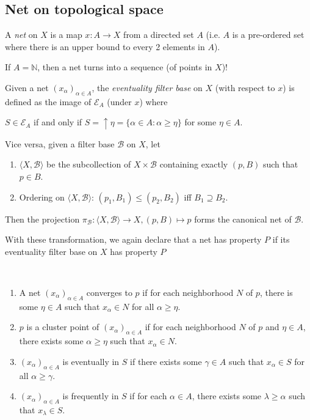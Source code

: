 \documentclass{treatise}
\begin{document}
\subsection{Net on topological space}
A \emph{net} on $X$ is a map $x: A \to X$ from a directed set $A$ (i.e. $A$ is a pre-ordered set where there is an upper bound to every 2 elements in $A$).
\begin{remark}
If $A = \mathbb{N}$, then a net turns into a sequence (of points in $X$)!
\end{remark}
\begin{remark}
Given a net $(x_\alpha)_{\alpha \in A}$, the \emph{eventuality filter base} on $X$ (with respect to $x$) is defined as the image of $\mathcal{E}_A$ (under $x$) where
\begin{center}
    $S \in \mathcal{E}_A$ if and only if $S = \uparrow \eta = \{ \alpha \in A : \alpha \geq \eta \}$ for some $\eta \in A$.
\end{center}
Vice versa, given a filter base $\mathcal{B}$ on $X$, let
\begin{enumerate}
    \item $\langle X, \mathcal{B} \rangle$ be the subcollection of $X \times \mathcal{B}$ containing exactly $(p, B)$ such that $p \in B$.
    \item Ordering on $\langle X, \mathcal{B} \rangle$: $(p_1, B_1) \leq (p_2, B_2)$ iff $B_1 \supseteq B_2$.
\end{enumerate}
Then the projection $\pi_\mathcal{B}: \langle X, \mathcal{B} \rangle \to X, (p, B) \mapsto p$ forms the canonical net of $\mathcal{B}$.
\end{remark}
With these transformation, we again declare that a net has property $P$ if its eventuality filter base on $X$ has property $P$
\begin{remark}
\ 
\begin{enumerate}
    \item A net $(x_\alpha)_{\alpha \in A}$ converges to $p$ if for each neighborhood $N$ of $p$, there is some $\eta \in A$ such that $x_\alpha \in N$ for all $\alpha \geq \eta$.
    \item $p$ is a cluster point of $(x_\alpha)_{\alpha \in A}$ if for each neighborhood $N$ of $p$ and $\eta \in A$, there exists some $\alpha \geq \eta$ such that $x_\alpha \in N$.
    \item $(x_\alpha)_{\alpha \in A}$ is eventually in $S$ if there exists some $\gamma \in A$ such that $x_\alpha \in S$ for all $\alpha \geq \gamma$.
    \item $(x_\alpha)_{\alpha \in A}$ is frequently in $S$ if for each $\alpha \in A$, there exists some $\lambda \geq \alpha$ such that $x_\lambda \in S$.
\end{enumerate}
\end{remark}
\end{document}
